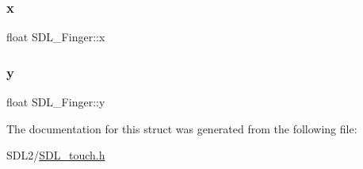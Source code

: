 \mbox{\label{struct_s_d_l___finger_ab91dfbd03c3215560457fef44e1c7755}} 
\subsubsection{\texorpdfstring{x}{x}}
{\footnotesize\ttfamily float S\+D\+L\+\_\+\+Finger\+::x}

\mbox{\label{struct_s_d_l___finger_a0a2c7a06ae641940111e03801c672cf9}} 
\subsubsection{\texorpdfstring{y}{y}}
{\footnotesize\ttfamily float S\+D\+L\+\_\+\+Finger\+::y}



The documentation for this struct was generated from the following file\+:\begin{DoxyCompactItemize}
\item 
S\+D\+L2/\hyperlink{_s_d_l__touch_8h}{S\+D\+L\+\_\+touch.\+h}\end{DoxyCompactItemize}
